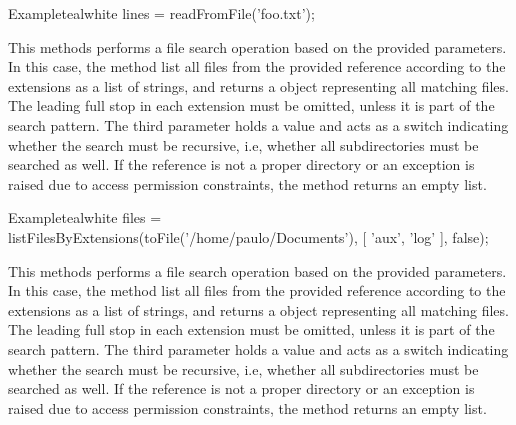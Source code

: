 \begin{description}
\begin{codebox}{Example}{teal}{\icnote}{white}
lines = readFromFile('foo.txt');
\end{codebox}

\item[\mdbox{R}{\parbox{0.61\textwidth}{listFilesByExtensions(File file,\\\hspace*{1em} List<String> extensions, boolean recursive)}}{List<File>}] This methods performs a file search operation based on the provided parameters. In this case, the method list all files from the provided  reference according to the  extensions as a list of strings, and returns a  object representing all matching files. The leading full stop in each extension must be omitted, unless it is part of the search pattern. The third parameter holds a  value and acts as a switch indicating whether the search must be recursive, i.e, whether all subdirectories must be searched as well. If the reference is not a proper directory or an exception is raised due to access permission constraints, the  method returns an empty list.

\begin{codebox}{Example}{teal}{\icnote}{white}
files = listFilesByExtensions(toFile('/home/paulo/Documents'),
        [ 'aux', 'log' ], false);
\end{codebox}

\item[\mdbox{R}{\parbox{0.61\textwidth}{listFilesByExtensions(String reference,\\\hspace*{1em} List<String> extensions, boolean recursive)}}{List<File>}] This methods performs a file search operation based on the provided parameters. In this case, the method list all files from the provided  reference according to the  extensions as a list of strings, and returns a  object representing all matching files. The leading full stop in each extension must be omitted, unless it is part of the search pattern. The third parameter holds a  value and acts as a switch indicating whether the search must be recursive, i.e, whether all subdirectories must be searched as well. If the reference is not a proper directory or an exception is raised due to access permission constraints, the  method returns an empty list.


\end{description}
